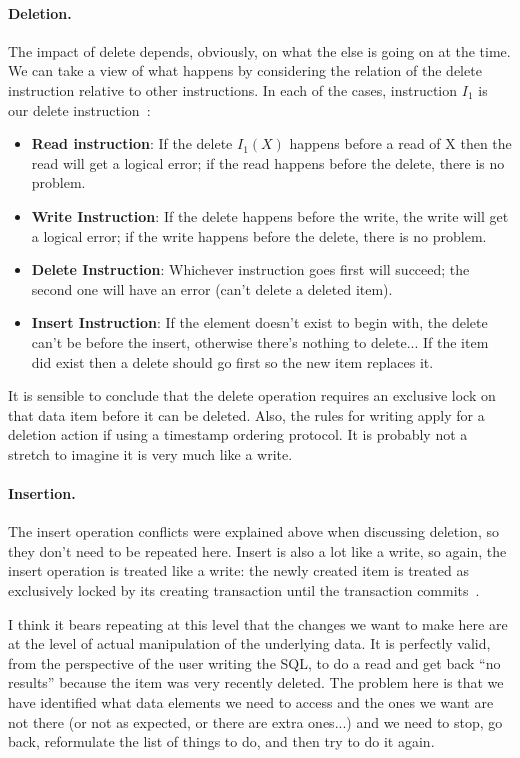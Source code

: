 \documentclass[a4paper]{report}
\begin{document}
\paragraph{Deletion.} The impact of delete depends, obviously, on what the else is going on at the time. We can take a view of what happens by considering the relation of the delete instruction relative to other instructions. In each of the cases, instruction $I_{1}$ is our delete instruction~\cite{dsc}:

\begin{itemize}
	\item \textbf{Read instruction}: If the delete $I_{1}(X)$ happens before a read of X then the read will get a logical error; if the read happens before the delete, there is no problem.
	\item \textbf{Write Instruction}: If the delete happens before the write, the write will get a logical error; if the write happens before the delete, there is no problem.
	\item \textbf{Delete Instruction}: Whichever instruction goes first will succeed; the second one will have an error (can't delete a deleted item).
	\item \textbf{Insert Instruction}: If the element doesn't exist to begin with, the delete can't be before the insert, otherwise there's nothing to delete... If the item did exist then a delete should go first so the new item replaces it.
\end{itemize}

It is sensible to conclude that the delete operation requires an exclusive lock on that data item before it can be deleted. Also, the rules for writing apply for a deletion action if using a timestamp ordering protocol. It is probably not a stretch to imagine it is very much like a write.

\paragraph{Insertion.} The insert operation conflicts were explained above when discussing deletion, so they don't need to be repeated here. Insert is also a lot like a write, so again, the insert operation is treated like a write: the newly created item is treated as exclusively locked by its creating transaction until the transaction commits~\cite{dsc}.

I think it bears repeating at this level that the changes we want to make here are at the level of actual manipulation of the underlying data. It is perfectly valid, from the perspective of the user writing the SQL, to do a read and get back ``no results'' because the item was very recently deleted. The problem here is that we have identified what data elements we need to access and the ones we want are not there (or not as expected, or there are extra ones...) and we need to stop, go back, reformulate the list of things to do, and then try to do it again. 
\end{document}
